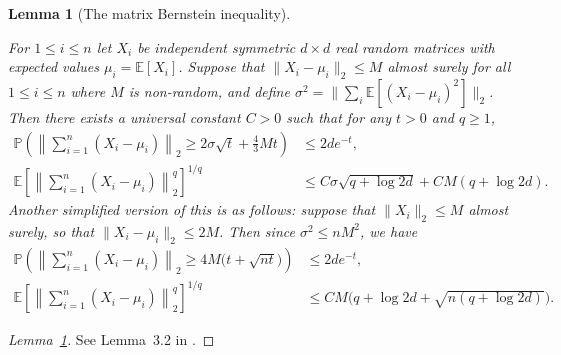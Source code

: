 \documentclass[11pt,lof]{puthesis}
\renewcommand{\P}{\ensuremath{\mathbb{P}}}
\newcommand{\E}{\ensuremath{\mathbb{E}}}
\theoremstyle{break}
\newtheorem{lemma}{Lemma}[section]
\theoremstyle{proof}
\newtheorem{proof}{Proof}
\begin{document}
\begin{lemma}[The matrix Bernstein inequality]
  \label{lem:kernel_app_matrix_bernstein}

  For $1 \leq i \leq n$
  let $X_i$ be independent symmetric $d \times d$
  real random matrices
  with expected values $\mu_i = \E[X_i]$.
  Suppose that
  $\|X_i - \mu_i\|_2 \leq M$
  almost surely for all $1 \leq i \leq n$
  where $M$ is non-random, and define
  $\sigma^2 = \big\| \sum_i \E[(X_i - \mu_i)^2] \big\|_2$.
  Then there exists a universal constant $C > 0$
  such that
  for any $t > 0$ and $q \geq 1$,
  \begin{align*}
    \P\left(
      \left\|
        \sum_{i=1}^n
        \left(
          X_i - \mu_i
        \right)
      \right\|_2
      \geq
      2 \sigma \sqrt{t}
      + \frac{4}{3} M t
    \right)
    &\leq
    2 d e^{-t}, \\
    \E\left[
      \left\|
        \sum_{i=1}^n
        \left(
          X_i - \mu_i
        \right)
      \right\|_2^q
    \right]^{1/q}
    &\leq
    C \sigma \sqrt{q + \log 2d}
    + C M (q + \log 2d).
  \end{align*}
  Another simplified version of this is as follows:
  suppose that
  $\|X_i\|_2 \leq M$ almost surely,
  so that
  $\|X_i - \mu_i\|_2 \leq 2M$.
  Then since
  $\sigma^2 \leq n M^2$,
  we have
  \begin{align*}
    \P\left(
      \left\|
        \sum_{i=1}^n
        \left(
          X_i - \mu_i
        \right)
      \right\|_2
      \geq
      4M \big(t + \sqrt{n t}\big)
    \right)
    &\leq
    2 d e^{-t}, \\
    \E\left[
      \left\|
        \sum_{i=1}^n
        \left(
          X_i - \mu_i
        \right)
      \right\|_2^q
    \right]^{1/q}
    &\leq
    C M
    \big(q + \log 2d + \sqrt{n(q + \log 2d)}\big).
  \end{align*}

\end{lemma}

\begin{proof}[Lemma~\ref{lem:kernel_app_matrix_bernstein}]

  See Lemma~3.2 in \citet{minsker2019moment}.
\end{proof}
\end{document}
